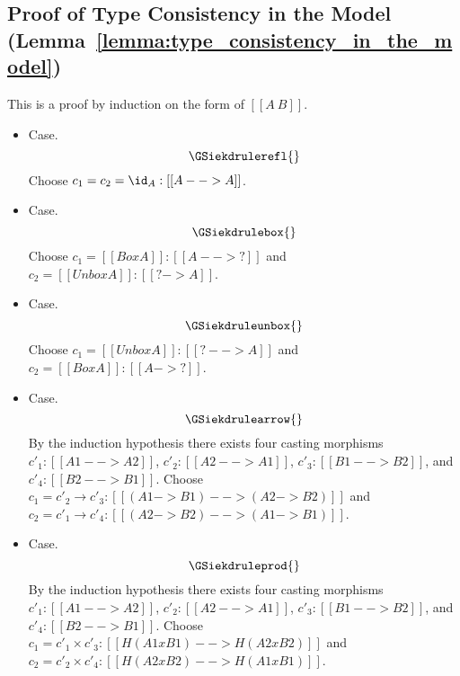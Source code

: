 \subsection{Proof of Type Consistency in the Model (Lemma~\ref{lemma:type_consistency_in_the_model})}
\label{subsec:proof_of_type_consistency_in_the_model}
This is a proof by induction on the form of $[[A ~ B]]$.
\begin{itemize}
\item[] Case.
  \[
  \GSiekdrulerefl{}
  \]
  Choose $c_1 = c_2 = \id_A : [[A --> A]]$.

\item[] Case.
  \[
  \GSiekdrulebox{}
  \]
  Choose $c_1 = [[Box A]] : [[A --> ?]]$ and $c_2 = [[Unbox A]] : [[? -> A]]$.

\item[] Case.
  \[
  \GSiekdruleunbox{}
  \]
  Choose $c_1 = [[Unbox A]] : [[? --> A]]$ and $c_2 = [[Box A]] : [[A -> ?]]$.
  
\item[] Case.
  \[
  \GSiekdrulearrow{}
  \]
  By the induction hypothesis there exists four casting morphisms
  $c'_1 : [[A1 --> A2]]$, $c'_2 : [[A2 --> A1]]$, $c'_3 : [[B1 --> B2]]$,
  and $c'_4 : [[B2 --> B1]]$.  Choose
  $c_1 = c'_2 \to c'_3 : [[(A1 -> B1) --> (A2 -> B2)]]$
  and
  $c_2 = c'_1 \to c'_4 : [[(A2 -> B2) --> (A1 -> B1)]]$.

\item[] Case.
  \[
  \GSiekdruleprod{}
  \]
  By the induction hypothesis there exists four casting morphisms
  $c'_1 : [[A1 --> A2]]$, $c'_2 : [[A2 --> A1]]$, $c'_3 : [[B1 --> B2]]$,
  and $c'_4 : [[B2 --> B1]]$.
  Choose
  $c_1 = c'_1 \times c'_3 : [[H(A1 x B1) --> H(A2 x B2)]]$
  and
  $c_2 = c'_2 \times c'_4 : [[H(A2 x B2) --> H(A1 x B1)]]$.
\end{itemize}

